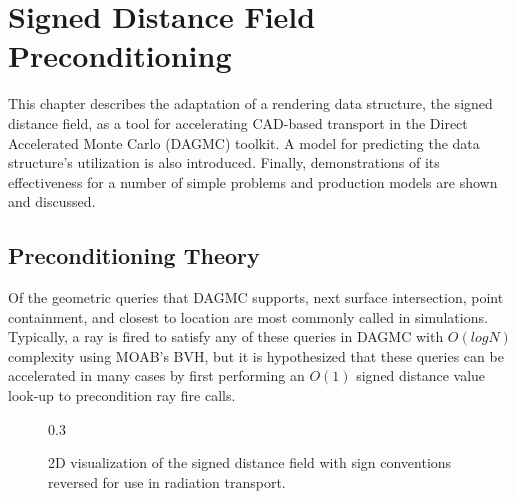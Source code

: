 

\newcommand{\precondQuery}[4] {
  \null %
  \textbf{\uppercase{#1}} 
  \begin{adjustwidth}{1em}{0pt}
    \begin{figure}[H]
      \begin{center}
        {0.65\textwidth}
        \caption{#3}
        \label{fig:#2}
      \end{center}
    \end{figure}
    #4
  \end{adjustwidth}
}

\chapter{Signed Distance Field Preconditioning}\label{ch:preconditioning}

This chapter describes the adaptation of a rendering data structure, the signed
distance field, as a tool for accelerating CAD-based transport in the Direct
Accelerated Monte Carlo (DAGMC) toolkit. A model for predicting the data
structure's utilization is also introduced. Finally, demonstrations of its
effectiveness for a number of simple problems and production models are shown
and discussed.

\section{Preconditioning Theory}\label{section:preconditioner_theory}

Of the geometric queries that DAGMC supports, next surface intersection, point
containment, and closest to location are most commonly called in simulations.
Typically, a ray is fired to satisfy any of these queries in DAGMC with
$O(logN)$ complexity using MOAB's BVH, but it is hypothesized that these queries
can be accelerated in many cases by first performing an $O(1)$ signed distance
value look-up to precondition ray fire calls.

\begin{figure}[ht]
  {0.3\textwidth}
  \centering
  \caption{2D visualization of the signed distance field with sign conventions
    reversed for use in radiation transport.}
  \label{fig:preconditioner_datastruct}
\end{figure}


